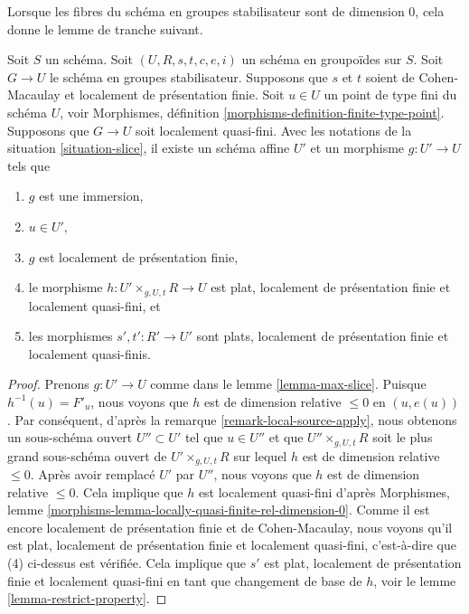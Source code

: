 \noindent
Lorsque les fibres du schéma en groupes stabilisateur sont de dimension 0,
cela donne le lemme de tranche suivant.

\begin{lemma}
\label{lemma-max-slice-quasi-finite}
Soit $S$ un schéma.
Soit $(U, R, s, t, c, e, i)$ un schéma en groupoïdes sur $S$.
Soit $G \to U$ le schéma en groupes stabilisateur.
Supposons que $s$ et $t$ soient de Cohen-Macaulay et localement de présentation finie.
Soit $u \in U$ un point de type fini du schéma $U$, voir
Morphismes, définition \ref{morphisms-definition-finite-type-point}.
Supposons que $G \to U$ soit localement quasi-fini.
Avec les notations de la
situation \ref{situation-slice},
il existe un schéma affine $U'$ et un morphisme $g : U' \to U$ tels que
\begin{enumerate}
\item $g$ est une immersion,
\item $u \in U'$,
\item $g$ est localement de présentation finie,
\item le morphisme $h : U' \times_{g, U, t} R \longrightarrow U$
est plat, localement de présentation finie et localement quasi-fini, et
\item les morphismes $s', t' : R' \to U'$ sont plats,
localement de présentation finie et localement quasi-finis.
\end{enumerate}
\end{lemma}

\begin{proof}
Prenons $g : U' \to U$ comme dans le
lemme \ref{lemma-max-slice}.
Puisque $h^{-1}(u) = F'_u$, nous voyons que $h$ est de dimension relative
$\leq 0$ en $(u, e(u))$. Par conséquent, d'après la
remarque \ref{remark-local-source-apply},
nous obtenons un sous-schéma ouvert $U'' \subset U'$ tel que
$u \in U''$ et que $U'' \times_{g, U, t} R$ soit le plus grand sous-schéma ouvert
de $U' \times_{g, U, t} R$ sur lequel $h$ est de dimension relative $\leq 0$.
Après avoir remplacé $U'$ par $U''$, nous voyons que $h$ est de dimension relative $\leq 0$.
Cela implique que $h$ est localement quasi-fini d'après
Morphismes, lemme \ref{morphisms-lemma-locally-quasi-finite-rel-dimension-0}.
Comme il est encore localement de présentation finie et de Cohen-Macaulay, nous voyons
qu'il est plat, localement de présentation finie et localement quasi-fini,
c'est-à-dire que (4) ci-dessus est vérifiée. Cela implique que $s'$ est plat, localement de
présentation finie et localement quasi-fini en tant que changement de base de $h$, voir
le lemme \ref{lemma-restrict-property}.
\end{proof}








